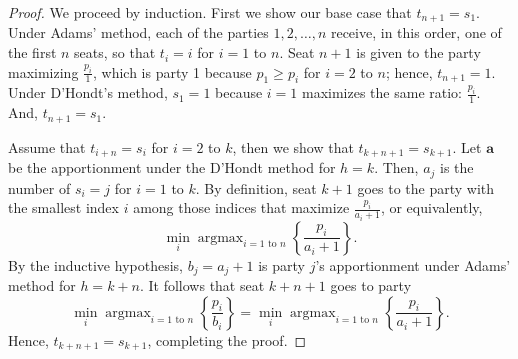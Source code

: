 \documentclass[10pt,a4paper]{amsart}
\DeclareMathOperator*{\argmax}{argmax}
\begin{document}
\begin{proof} 
We proceed by induction. First we show our base case that $t_{n+1} = s_1$.  Under Adams' method, each of the parties $1, 2,  \dots, n$ receive, in this order, one of the first $n$ seats, so that $t_i = i$ for $i = 1$ to $n$. Seat $n+1$ is given to the party maximizing $\frac{p_i}{1}$, which is party 1 because $p_1 \ge p_i$ for $i=2$ to $n$; hence, $t_{n+1} = 1$. Under D'Hondt's method, $s_1 = 1$ because $i=1$ maximizes the same ratio: $\frac{p_i}{1}$. And, $t_{n+1} = s_1$.

Assume that $t_{i+n} = s_i$ for $i = 2$ to $k$, then we show that $t_{k+n+1} = s_{k+1}$. Let $\mathbf a$ be the apportionment under the D'Hondt method for $h=k$. Then, $a_j$ is the number of $s_i = j$ for $i = 1$ to $k$.  By definition, seat $k+1$ goes to the party with the smallest index $i$ among those indices that maximize $\frac{p_i}{a_i+1}$, or equivalently,
\begin{equation*}
\min_i \argmax_{i = 1 \text{ to }n} \left\{ \frac{p_i}{a_i + 1} \right\}.
\end{equation*}
By the inductive hypothesis, $b_j = a_j + 1$ is party $j$'s apportionment under Adams' method for $h = k+n$. It follows that seat $k+n+1$ goes to party 
\begin{equation*}
\min_i \argmax_{i = 1 \text{ to }n} \left\{ \frac{p_i}{b_i} \right\} = \min_i \argmax_{i = 1 \text{ to }n} \left\{ \frac{p_i}{a_i + 1} \right\}.
\end{equation*}
Hence, $t_{k+n+1} = s_{k+1}$, completing the proof.
\end{proof}
\end{document}
